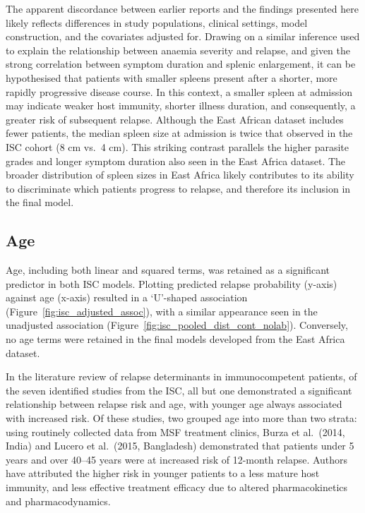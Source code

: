 The apparent discordance between earlier reports and the findings presented here likely reflects differences in study populations, clinical settings, model construction, and the covariates adjusted for. Drawing on a similar inference used to explain the relationship between anaemia severity and relapse, and given the strong correlation between symptom duration and splenic enlargement, it can be hypothesised that patients with smaller spleens present after a shorter, more rapidly progressive disease course. In this context, a smaller spleen at admission may indicate weaker host immunity, shorter illness duration, and consequently, a greater risk of subsequent relapse. Although the East African dataset includes fewer patients, the median spleen size at admission is twice that observed in the ISC cohort (8 cm vs.\ 4 cm). This striking contrast parallels the higher parasite grades and longer symptom duration also seen in the East Africa dataset. The broader distribution of spleen sizes in East Africa likely contributes to its ability to discriminate which patients progress to relapse, and therefore its inclusion in the final model.

\subsection{Age}

Age, including both linear and squared terms, was retained as a significant predictor in both ISC models. Plotting predicted relapse probability (y-axis) against age (x-axis) resulted in a `U'-shaped association (Figure~\ref{fig:isc_adjusted_assoc}), with a similar appearance seen in the unadjusted association (Figure~\ref{fig:isc_pooled_dist_cont_nolab}). Conversely, no age terms were retained in the final models developed from the East Africa dataset.

In the literature review of relapse determinants in immunocompetent patients, of the seven identified studies from the ISC, all but one demonstrated a significant relationship between relapse risk and age, with younger age always associated with increased risk\cite{burza2014,goyal2019,goyal2020,lucero2015,rijal2013,sundar2019}. Of these studies, two grouped age into more than two strata: using routinely collected data from MSF treatment clinics, Burza et al.\ (2014, India)\cite{burza2014} and Lucero et al.\ (2015, Bangladesh)\cite{lucero2015} demonstrated that patients under 5 years and over 40--45 years were at increased risk of 12-month relapse. Authors have attributed the higher risk in younger patients to a less mature host immunity\cite{burza2014,goyal2020,rijal2013}, and less effective treatment efficacy due to altered pharmacokinetics and pharmacodynamics\cite{rijal2013,goyal2020}.

